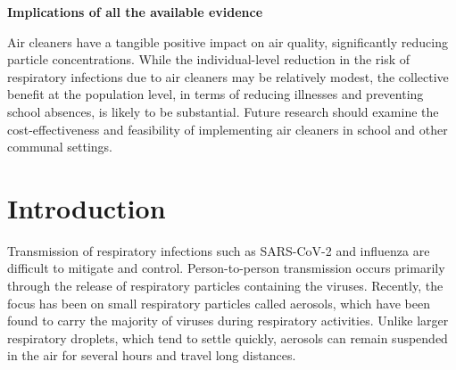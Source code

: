 \documentclass[fleqn,11pt]{wlscirep}
\begin{document}
\noindent \textbf{Implications of all the available evidence} \smallskip

\noindent Air cleaners have a tangible positive impact on air quality, significantly reducing particle concentrations. While the individual-level reduction in the risk of respiratory infections due to air cleaners may be relatively modest, the collective benefit at the population level, in terms of reducing illnesses and preventing school absences, is likely to be substantial. Future research should examine the cost-effectiveness and feasibility of implementing air cleaners in school and other communal settings.  
 

\thispagestyle{empty}
\sloppy
\raggedbottom

\newpage

\setcounter{page}{1}

\section*{Introduction} 

Transmission of respiratory infections such as SARS-CoV-2 and influenza are difficult to mitigate and control. Person-to-person transmission occurs primarily through the release of respiratory particles containing the viruses. Recently, the focus has been on small respiratory particles called aerosols, which have been found to carry the majority of viruses during respiratory activities\cite{Fennelly2020}. Unlike larger respiratory droplets, which tend to settle quickly, aerosols can remain suspended in the air for several hours and travel long distances\cite{Coleman2022,Wang2020,Heneghan2021}.
\end{document}
